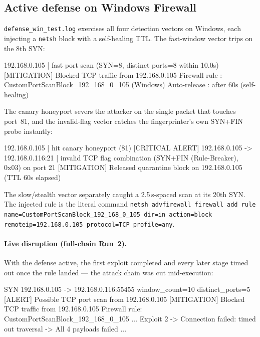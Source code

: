 \subsection{Active defense on Windows Firewall}\label{sub:defwin}
\texttt{defense\_win\_test.log} exercises all four detection vectors on Windows, each
injecting a \texttt{netsh} block with a self-healing TTL. The fast-window vector trips on
the 8th SYN:
\begin{logbox}
[ALERT] 192.168.0.105 | fast port scan (SYN=8, distinct ports=8 within 10.0s)
[MITIGATION] Blocked TCP traffic from 192.168.0.105
             Firewall rule : CustomPortScanBlock_192_168_0_105 (Windows)
             Auto-release  : after 60s (self-healing)
\end{logbox}
The canary honeyport severs the attacker on the single packet that touches port~81, and the
invalid-flag vector catches the fingerprinter's own SYN+FIN probe instantly:
\begin{logbox}
[ALERT] 192.168.0.105 | hit canary honeyport (81)
[CRITICAL ALERT] 192.168.0.105 -> 192.168.0.116:21 |
        invalid TCP flag combination (SYN+FIN (Rule-Breaker), 0x03) on port 21
[MITIGATION] Released quarantine block on 192.168.0.105 (TTL 60s elapsed)
\end{logbox}
The slow/stealth vector separately caught a 2.5\,s-spaced scan at its 20th SYN. The injected
rule is the literal command \texttt{netsh advfirewall firewall add rule
name=CustomPortScanBlock\_192\_168\_0\_105 dir=in action=block remoteip=192.168.0.105
protocol=TCP profile=any}.

\paragraph{Live disruption (full-chain Run~2).}
With the defense active, the first exploit completed and every later stage timed out once
the rule landed — the attack chain was cut mid-execution:
\begin{logbox}
SYN 192.168.0.105 -> 192.168.0.116:55455  window_count=10  distinct_ports=5
[ALERT] Possible TCP port scan from 192.168.0.105
[MITIGATION] Blocked TCP traffic from 192.168.0.105
             Firewall rule: CustomPortScanBlock_192_168_0_105
  ... Exploit 2 -> Connection failed: timed out   traversal -> All 4 payloads failed ...
\end{logbox}

